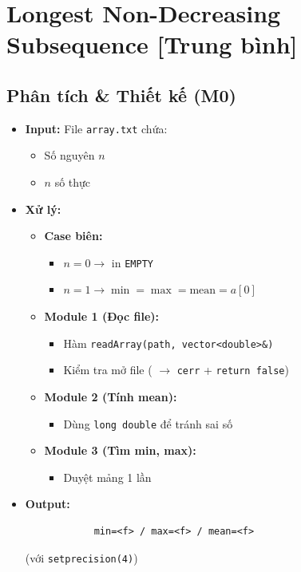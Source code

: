 \section{Longest Non-Decreasing Subsequence [Trung bình]}
\subsection{Phân tích \& Thiết kế (M0)}
    \begin{itemize}
    \item \textbf{Input:}
    File \texttt{array.txt} chứa:
    \begin{itemize}
        \item Số nguyên $n$
        \item $n$ số thực
    \end{itemize}

    \item \textbf{Xử lý:}
        \begin{itemize}
            \item \textbf{Case biên:}
            \begin{itemize}
                \item $n = 0 \rightarrow$ in \texttt{EMPTY}
                \item $n = 1 \rightarrow \min = \max = \text{mean} = a[0]$
            \end{itemize}
            
            \item \textbf{Module 1 (Đọc file):}
            \begin{itemize}
                \item Hàm \texttt{readArray(path, vector<double>\&)}
                \item Kiểm tra mở file ( $\rightarrow$ \texttt{cerr} + \texttt{return false})
            \end{itemize}
            
            \item \textbf{Module 2 (Tính mean):}
            \begin{itemize}
                \item Dùng \texttt{long double} để tránh sai số
            \end{itemize}
            
            \item \textbf{Module 3 (Tìm min, max):}
            \begin{itemize}
                \item Duyệt mảng 1 lần
            \end{itemize}
        \end{itemize}

        \item \textbf{Output:}
        \begin{lstlisting}
            min=<f> / max=<f> / mean=<f>\end{lstlisting} 
        (với \texttt{setprecision(4)})
    \end{itemize}

